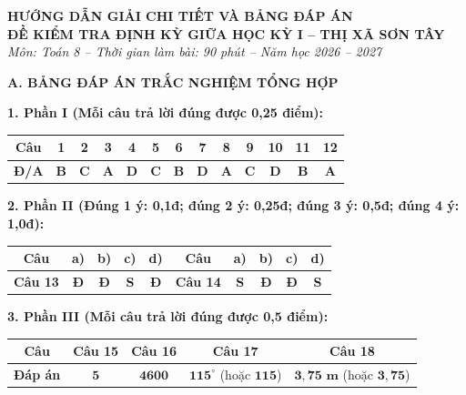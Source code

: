 \documentclass[11pt,a4paper]{article}
\begin{document}
\begin{center}
  \textbf{\Large HƯỚNG DẪN GIẢI CHI TIẾT VÀ BẢNG ĐÁP ÁN}\\
  \textbf{\large ĐỀ KIỂM TRA ĐỊNH KỲ GIỮA HỌC KỲ I -- THỊ XÃ SƠN TÂY}\\
  \textit{Môn: Toán 8 -- Thời gian làm bài: 90 phút -- Năm học 2026 -- 2027}
\end{center}
\vspace{1.5mm}

\noindent\textbf{\large A. BẢNG ĐÁP ÁN TRẮC NGHIỆM TỔNG HỢP}
\vspace{1.5mm}

\noindent\textbf{1. Phần I (Mỗi câu trả lời đúng được 0,25 điểm):}
\begin{center}
\begin{tabular}{|c|c|c|c|c|c|c|c|c|c|c|c|c|}
\hline
\textbf{Câu} & \textbf{1} & \textbf{2} & \textbf{3} & \textbf{4} & \textbf{5} & \textbf{6} & \textbf{7} & \textbf{8} & \textbf{9} & \textbf{10} & \textbf{11} & \textbf{12} \\
\hline
\textbf{Đ/A} & \textbf{B} & \textbf{C} & \textbf{A} & \textbf{D} & \textbf{C} & \textbf{B} & \textbf{D} & \textbf{A} & \textbf{C} & \textbf{D} & \textbf{B} & \textbf{A} \\
\hline
\end{tabular}
\end{center}
\vspace{1mm}

\noindent\textbf{2. Phần II (Đúng 1 ý: 0,1đ; đúng 2 ý: 0,25đ; đúng 3 ý: 0,5đ; đúng 4 ý: 1,0đ):}
\begin{center}
\begin{tabular}{|c|c|c|c|c||c|c|c|c|c|}
\hline
\textbf{Câu} & \textbf{a)} & \textbf{b)} & \textbf{c)} & \textbf{d)} & \textbf{Câu} & \textbf{a)} & \textbf{b)} & \textbf{c)} & \textbf{d)} \\
\hline
\textbf{Câu 13} & \textbf{Đ} & \textbf{Đ} & \textbf{S} & \textbf{Đ} & \textbf{Câu 14} & \textbf{S} & \textbf{Đ} & \textbf{Đ} & \textbf{S} \\
\hline
\end{tabular}
\end{center}
\vspace{1mm}

\noindent\textbf{3. Phần III (Mỗi câu trả lời đúng được 0,5 điểm):}
\begin{center}
\begin{tabular}{|c|c|c|c|c|}
\hline
\textbf{Câu} & \textbf{Câu 15} & \textbf{Câu 16} & \textbf{Câu 17} & \textbf{Câu 18} \\
\hline
\textbf{Đáp án} & $\mathbf{5}$ & $\mathbf{4600}$ & $\mathbf{115^\circ}$ (hoặc $\mathbf{115}$) & $\mathbf{3{,}75\text{ m}}$ (hoặc $\mathbf{3{,}75}$) \\
\hline
\end{tabular}
\end{center}
\vspace{2mm}
\end{document}
